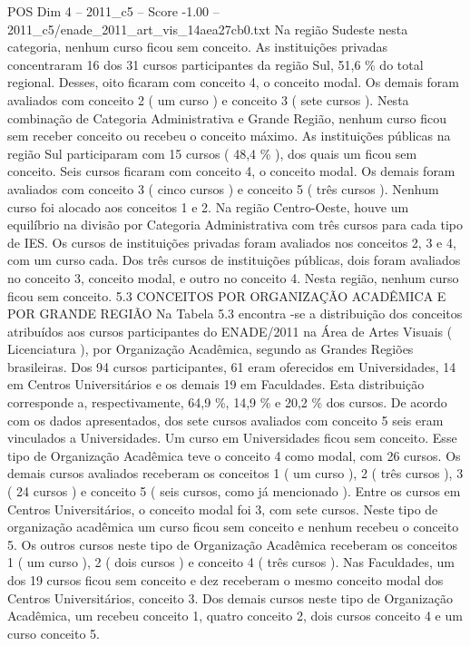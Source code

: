 \begin{textsample}{POS Dim 4 – 2011\_c5 – Score -1.00 – 2011\_c5/enade\_2011\_art\_vis\_14aea27cb0.txt}
Na região Sudeste nesta categoria, nenhum curso ficou sem conceito.
As instituições privadas concentraram 16 dos 31 cursos participantes da região Sul, 51,6 \% do total regional.
Desses, oito ficaram com conceito 4, o conceito modal.
Os demais foram avaliados com conceito 2 ( um curso ) e conceito 3 ( sete cursos ).
Nesta combinação de Categoria Administrativa e Grande Região, nenhum curso ficou sem receber conceito ou recebeu o conceito máximo.
As instituições públicas na região Sul participaram com 15 cursos ( 48,4 \% ), dos quais um ficou sem conceito.
Seis cursos ficaram com conceito 4, o conceito modal.
Os demais foram avaliados com conceito 3 ( cinco cursos ) e conceito 5 ( três cursos ).
Nenhum curso foi alocado aos conceitos 1 e 2.
Na região Centro-Oeste, houve um equilíbrio na divisão por Categoria Administrativa com três cursos para cada tipo de IES.
Os cursos de instituições privadas foram avaliados nos conceitos 2, 3 e 4, com um curso cada.
Dos três cursos de instituições públicas, dois foram avaliados no conceito 3, conceito modal, e outro no conceito 4.
Nesta região, nenhum curso ficou sem conceito. 5.3 CONCEITOS POR ORGANIZAÇÃO ACADÊMICA E POR GRANDE REGIÃO Na Tabela 5.3 encontra -se a distribuição dos conceitos atribuídos aos cursos participantes do ENADE/2011 na Área de Artes Visuais ( Licenciatura ), por Organização Acadêmica, segundo as Grandes Regiões brasileiras.
Dos 94 cursos participantes, 61 eram oferecidos em Universidades, 14 em Centros Universitários e os demais 19 em Faculdades.
Esta distribuição corresponde a, respectivamente, 64,9 \%, 14,9 \% e 20,2 \% dos cursos.
De acordo com os dados apresentados, dos sete cursos avaliados com conceito 5 seis eram vinculados a Universidades.
Um curso em Universidades ficou sem conceito.
Esse tipo de Organização Acadêmica teve o conceito 4 como modal, com 26 cursos.
Os demais cursos avaliados receberam os conceitos 1 ( um curso ), 2 ( três cursos ), 3 ( 24 cursos ) e conceito 5 ( seis cursos, como já mencionado ).
Entre os cursos em Centros Universitários, o conceito modal foi 3, com sete cursos.
Neste tipo de organização acadêmica um curso ficou sem conceito e nenhum recebeu o conceito 5.
Os outros cursos neste tipo de Organização Acadêmica receberam os conceitos 1 ( um curso ), 2 ( dois cursos ) e conceito 4 ( três cursos ).
Nas Faculdades, um dos 19 cursos ficou sem conceito e dez receberam o mesmo conceito modal dos Centros Universitários, conceito 3.
Dos demais cursos neste tipo de Organização Acadêmica, um recebeu conceito 1, quatro conceito 2, dois cursos conceito 4 e um curso conceito 5.

\end{textsample}
